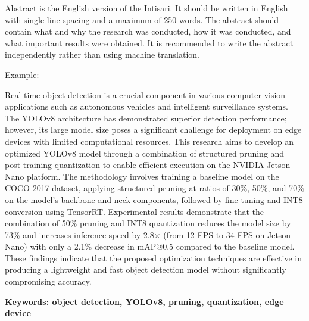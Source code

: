 Abstract is the English version of the Intisari. It should be written in English with single line spacing and a maximum of 250 words. The abstract should contain what and why the research was conducted, how it was conducted, and what important results were obtained. It is recommended to write the abstract independently rather than using machine translation.

Example:

Real-time object detection is a crucial component in various computer vision applications such as autonomous vehicles and intelligent surveillance systems. The YOLOv8 architecture has demonstrated superior detection performance; however, its large model size poses a significant challenge for deployment on edge devices with limited computational resources. This research aims to develop an optimized YOLOv8 model through a combination of structured pruning and post-training quantization to enable efficient execution on the NVIDIA Jetson Nano platform. The methodology involves training a baseline model on the COCO 2017 dataset, applying structured pruning at ratios of 30\%, 50\%, and 70\% on the model's backbone and neck components, followed by fine-tuning and INT8 conversion using TensorRT. Experimental results demonstrate that the combination of 50\% pruning and INT8 quantization reduces the model size by 73\% and increases inference speed by 2.8$\times$ (from 12 FPS to 34 FPS on Jetson Nano) with only a 2.1\% decrease in mAP@0.5 compared to the baseline model. These findings indicate that the proposed optimization techniques are effective in producing a lightweight and fast object detection model without significantly compromising accuracy.

\vspace{2ex}
\noindent\textbf{Keywords: object detection, YOLOv8, pruning, quantization, edge device}
